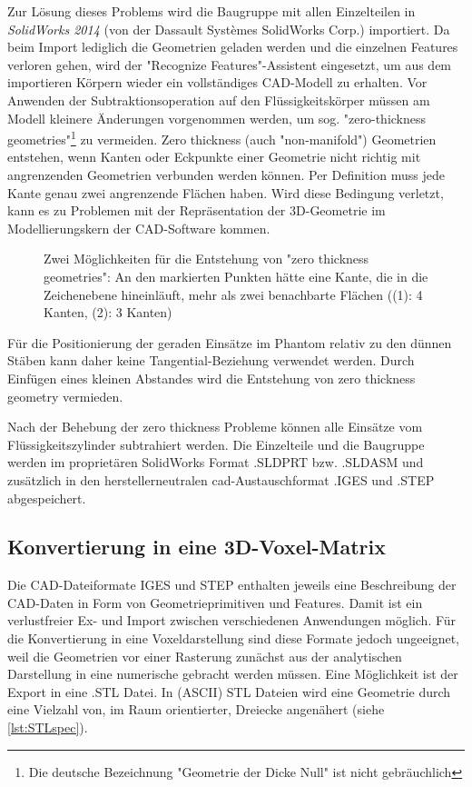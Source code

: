 Zur Lösung dieses Problems wird die Baugruppe mit allen Einzelteilen in \textit{SolidWorks 2014} (von der Dassault Systèmes SolidWorks Corp.) importiert. Da beim Import lediglich die Geometrien geladen werden und die einzelnen Features verloren gehen, wird der "Recognize Features"-Assistent eingesetzt, um aus dem importieren Körpern wieder ein vollständiges CAD-Modell zu erhalten. Vor Anwenden der Subtraktionsoperation auf den Flüssigkeitskörper müssen am Modell kleinere Änderungen vorgenommen werden, um sog. "zero-thickness geometries"\footnote{Die deutsche Bezeichnung "Geometrie der Dicke Null" ist nicht gebräuchlich} zu vermeiden. Zero thickness (auch  "non-manifold") Geometrien entstehen, wenn Kanten oder Eckpunkte einer Geometrie nicht richtig mit angrenzenden Geometrien verbunden werden können. Per Definition muss jede Kante genau zwei angrenzende Flächen haben. Wird diese Bedingung verletzt, kann es zu Problemen mit der Repräsentation der 3D-Geometrie im Modellierungskern der CAD-Software kommen.

\begin{figure}[H]
	\centering
	\caption[Zero Thickness]{Zwei Möglichkeiten für die Entstehung von "zero thickness geometries": An den markierten Punkten hätte eine Kante, die in die Zeichenebene hineinläuft, mehr als zwei benachbarte Flächen ((1): 4 Kanten, (2): 3 Kanten)}
	\label{fig:zeroThick}
\end{figure}

Für die Positionierung der geraden Einsätze im Phantom relativ zu den dünnen Stäben kann daher keine Tangential-Beziehung verwendet werden. Durch Einfügen eines kleinen Abstandes wird die Entstehung von zero thickness geometry vermieden.

Nach der Behebung der zero thickness Probleme können alle Einsätze vom Flüssigkeitszylinder subtrahiert werden. Die Einzelteile und die Baugruppe werden im proprietären SolidWorks Format .SLDPRT bzw. .SLDASM und zusätzlich in den herstellerneutralen \gls{cad}-Austauschformat .IGES und .STEP abgespeichert.

\subsection{Konvertierung in eine 3D-Voxel-Matrix}
Die CAD-Dateiformate IGES und STEP enthalten jeweils eine Beschreibung der CAD-Daten in Form von Geometrieprimitiven und Features. Damit ist ein verlustfreier Ex- und Import zwischen verschiedenen Anwendungen möglich. Für die Konvertierung in eine Voxeldarstellung sind diese Formate jedoch ungeeignet, weil die Geometrien vor einer Rasterung zunächst aus der analytischen Darstellung in eine numerische gebracht werden müssen. Eine Möglichkeit ist der Export in eine .STL Datei. In (ASCII) STL Dateien wird eine Geometrie durch eine Vielzahl von, im Raum orientierter, Dreiecke angenähert (siehe \autoref{lst:STLspec}).

